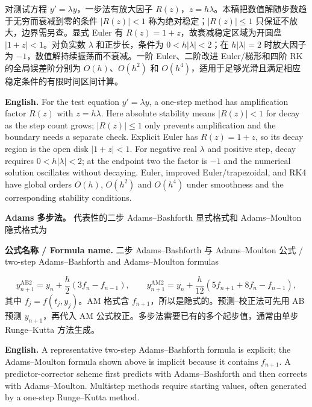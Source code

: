 \documentclass[UTF8,11pt,a4paper]{ctexart}
\newcommand{\EN}[1]{\par\noindent\textbf{English.} #1\par}
\newcommand{\FORMULA}[2]{\par\noindent\textbf{公式名称 / Formula name.} #1 / #2\par}
\begin{document}
\noindent 对测试方程 $y'=\lambda y$，一步法有放大因子 $R(z)$，$z=h\lambda$。本稿把数值解随步数趋于无穷而衰减到零的条件 $|R(z)|<1$ 称为绝对稳定；$|R(z)|\le1$ 只保证不放大，边界需另查。显式 Euler 有 $R(z)=1+z$，故衰减稳定区域为开圆盘 $|1+z|<1$。对负实数 $\lambda$ 和正步长，条件为 $0<h|\lambda|<2$；在 $h|\lambda|=2$ 时放大因子为 $-1$，数值解持续振荡而不衰减。一阶 Euler、二阶改进 Euler/梯形和四阶 RK 的全局误差阶分别为 $O(h)$、$O(h^2)$ 和 $O(h^4)$，适用于足够光滑且满足相应稳定条件的有限时间区间计算。
\EN{For the test equation $y'=\lambda y$, a one-step method has amplification factor $R(z)$ with $z=h\lambda$. Here absolute stability means $|R(z)|<1$ for decay as the step count grows; $|R(z)|\le1$ only prevents amplification and the boundary needs a separate check. Explicit Euler has $R(z)=1+z$, so its decay region is the open disk $|1+z|<1$. For negative real $\lambda$ and positive step, decay requires $0<h|\lambda|<2$; at the endpoint two the factor is $-1$ and the numerical solution oscillates without decaying. Euler, improved Euler/trapezoidal, and RK4 have global orders $O(h)$, $O(h^2)$ and $O(h^4)$ under smoothness and the corresponding stability conditions.}

\noindent\textbf{Adams 多步法。} 代表性的二步 Adams--Bashforth 显式格式和 Adams--Moulton 隐式格式为
\FORMULA{二步 Adams--Bashforth 与 Adams--Moulton 公式}{two-step Adams--Bashforth and Adams--Moulton formulas}
\[
y_{n+1}^{\mathrm{AB2}}=y_n+\frac h2(3f_n-f_{n-1}),\qquad
y_{n+1}^{\mathrm{AM2}}=y_n+\frac h{12}(5f_{n+1}+8f_n-f_{n-1}),
\]
其中 $f_j=f(t_j,y_j)$。AM 格式含 $f_{n+1}$，所以是隐式的。预测--校正法可先用 AB 预测 $y_{n+1}$，再代入 AM 公式校正。多步法需要已有的多个起步值，通常由单步 Runge--Kutta 方法生成。
\EN{A representative two-step Adams--Bashforth formula is explicit; the Adams--Moulton formula shown above is implicit because it contains $f_{n+1}$. A predictor-corrector scheme first predicts with Adams--Bashforth and then corrects with Adams--Moulton. Multistep methods require starting values, often generated by a one-step Runge--Kutta method.}
\end{document}
